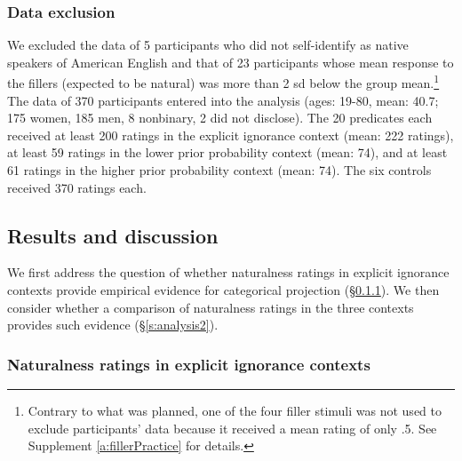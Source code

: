 \documentclass[11pt,fleqn]{article}
\newcommand{\6}{\mbox{$[\hspace*{-.6mm}[$}}
\newcommand{\9}{\mbox{$]\hspace*{-.6mm}]$}}
\begin{document}
\subsubsection{Data exclusion} 

We excluded the data of 5 participants who did not self-identify as native speakers of American English and that of 23 participants whose mean response to the fillers (expected to be natural) was more than 2 sd below the group mean.\footnote{Contrary to what was planned, one of the four filler stimuli was not used to exclude participants' data because it received a mean rating of only .5. See Supplement \ref{a:fillerPractice} for details.} The data of 370 participants entered into the analysis (ages: 19-80, mean: 40.7; 175 women, 185 men, 8 nonbinary, 2 did not disclose). The 20 predicates each received at least 200 ratings in the explicit ignorance context (mean: 222 ratings), at least 59 ratings in the lower prior probability context (mean: 74), and at least 61 ratings in the higher prior probability context (mean: 74). The six controls received 370 ratings each. 

\subsection{Results and discussion}

We first address the question of whether naturalness ratings in explicit ignorance contexts provide empirical evidence for categorical projection (\S\ref{s:analysis1}). We then consider whether a comparison of naturalness ratings in the three contexts provides such evidence (\S\ref{s:analysis2}).

\subsubsection{Naturalness ratings in explicit ignorance contexts}\label{s:analysis1}
\end{document}
